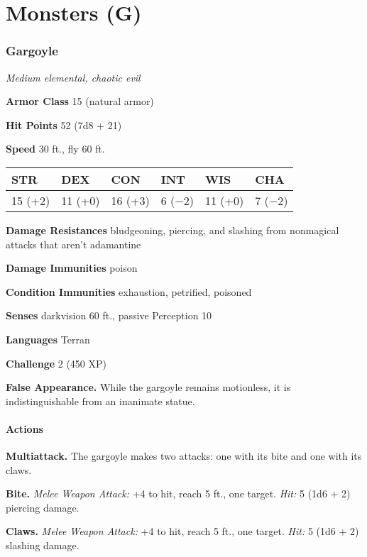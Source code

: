 \documentclass[
]{article}
\date{}
\begin{document}
\hypertarget{monsters-g}{%
\section{Monsters (G)}\label{monsters-g}}

\hypertarget{gargoyle}{%
\subsubsection{Gargoyle}\label{gargoyle}}

\emph{Medium elemental, chaotic evil}

\textbf{Armor Class} 15 (natural armor)

\textbf{Hit Points} 52 (7d8 + 21)

\textbf{Speed} 30 ft., fly 60 ft.

\begin{longtable}[]{@{}llllll@{}}
\toprule
STR & DEX & CON & INT & WIS & CHA\tabularnewline
\midrule
\endhead
15 (+2) & 11 (+0) & 16 (+3) & 6 (−2) & 11 (+0) & 7 (−2)\tabularnewline
\bottomrule
\end{longtable}

\textbf{Damage Resistances} bludgeoning, piercing, and slashing from
nonmagical attacks that aren't adamantine

\textbf{Damage Immunities} poison

\textbf{Condition Immunities} exhaustion, petrified, poisoned

\textbf{Senses} darkvision 60 ft., passive Perception 10

\textbf{Languages} Terran

\textbf{Challenge} 2 (450 XP)

\textbf{False Appearance.} While the gargoyle remains motionless, it is
indistinguishable from an inanimate statue.

\hypertarget{actions}{%
\paragraph{Actions}\label{actions}}

\textbf{Multiattack.} The gargoyle makes two attacks: one with its bite
and one with its claws.

\textbf{Bite.} \emph{Melee Weapon Attack:} +4 to hit, reach 5 ft., one
target. \emph{Hit:} 5 (1d6 + 2) piercing damage.

\textbf{Claws.} \emph{Melee Weapon Attack:} +4 to hit, reach 5 ft., one
target. \emph{Hit:} 5 (1d6 + 2) slashing damage.
\end{document}
